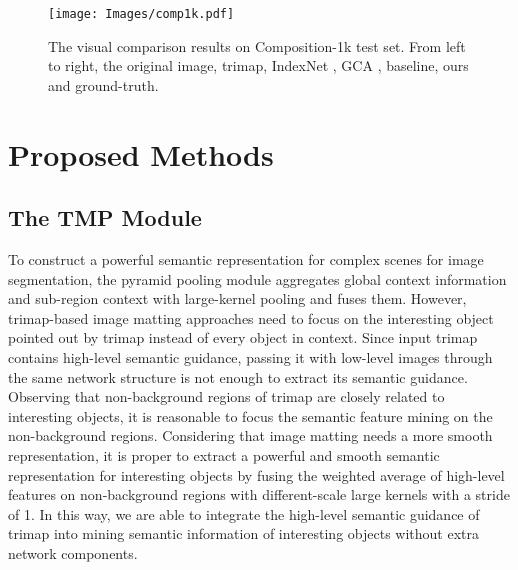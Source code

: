 \documentclass[10pt,twocolumn,letterpaper]{article}
\begin{document}
\begin{figure*}[t]
	\centering
	\texttt{[image: Images/comp1k.pdf]}
	\caption{The visual comparison results on Composition-1k \cite{deepmatting} test set. From left to right, the original image, trimap, IndexNet \cite{indexnet}, GCA \cite{gca}, baseline, ours and ground-truth. }
	\label{fig:comp1k}
\end{figure*}

\section{Proposed Methods}
\subsection{The TMP Module}
To construct a powerful semantic representation for complex scenes for image segmentation, the pyramid pooling module \cite{psp} aggregates global context information and sub-region context with large-kernel pooling and fuses them. However, trimap-based image matting approaches need to focus on the interesting object pointed out by trimap instead of every object in context.  Since input trimap contains high-level semantic guidance, passing it with low-level images through the same network structure is not enough to extract its  semantic guidance. Observing that non-background regions of trimap are closely related to interesting objects, it is reasonable to focus the semantic feature mining on the non-background regions. Considering that image matting needs a more smooth representation, it is proper to extract a powerful and smooth  semantic representation for interesting objects by fusing the weighted average of high-level features on non-background regions with different-scale large kernels with a stride of 1. In this way, we are able to integrate the high-level semantic guidance of trimap into mining semantic information of interesting objects without extra network components.
\end{document}
